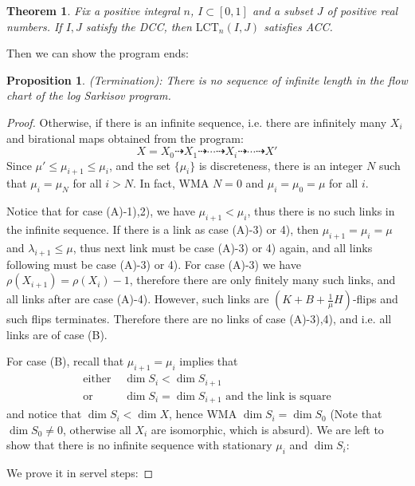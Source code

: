 \documentclass{article}
\newtheorem{prop}[defn]{Proposition}
\newtheorem{thm}[defn]{Theorem}
\begin{document}
\begin{thm}
Fix a positive integral $ n $, $ I\subset [0,1] $ and a subset $ J $ of positive real numbers. If $ I,J $ satisfy the DCC, then $ \mathrm{LCT}_n(I,J) $ satisfies ACC.
\end{thm}

Then we can show the program ends:
\begin{prop}
(Termination):
There is no sequence of infinite length in the flow chart of the log Sarkisov program.
\end{prop}
\begin{proof}
Otherwise, if there is an infinite sequence, i.e. there are infinitely many $ X_i $ and birational maps obtained from the program:
$$ X=X_0\dashrightarrow X_1\dashrightarrow \cdots\dashrightarrow X_i \dashrightarrow\cdots\dashrightarrow X'$$
Since $ \mu'\leqslant\mu_{i+1}\leqslant \mu_i $, and the set $ \{\mu_i\} $ is discreteness, there is an integer $ N $ such that $ \mu_i=\mu_N $ for all $ i>N $. In fact, WMA $ N=0 $ and $ \mu_i=\mu_0=\mu $ for all $ i $.

Notice that for case (A)-1),2), we have $ \mu_{i+1}<\mu_i $, thus there is no such links in the infinite sequence. If there is a link as case (A)-3) or 4), then $ \mu_{i+1}=\mu_i=\mu  $ and $ \lambda_{i+1}\leqslant \mu $, thus next link must be case (A)-3) or 4) again, and all links following must be case (A)-3) or 4). For case (A)-3) we have $ \rho(X_{i+1})=\rho(X_i)-1 $, therefore there are only finitely many such links, and all links after are  case (A)-4). However, such links are $ (K+B+\frac{1}{\mu}H) $-flips and such flips terminates. Therefore there are no links of case (A)-3),4), and i.e. all links are of case (B).

For case (B), recall that $ \mu_{i+1}=\mu_i $ implies that
\begin{equation*}
\begin{aligned}
\text{either } &\dim S_i<\dim S_{i+1} \\
\text{or }&\dim S_i=\dim S_{i+1} \text{ and the link is square}
\end{aligned}
\end{equation*}
and notice that $ \dim S_i< \dim X $, hence WMA $ \dim S_i=\dim S_0 $ (Note that $ \dim S_0 \neq 0$, otherwise all $ X_i $ are isomorphic, which is absurd). We are left to show that there is no infinite sequence with stationary $ \mu_i $ and $ \dim S_i $:

We prove it in servel steps:


\end{proof}
\end{document}
